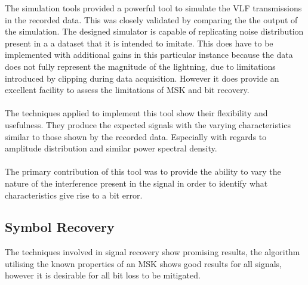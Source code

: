 The simulation tools provided a powerful tool to simulate the VLF transmissions in the recorded data. This was closely validated by comparing the the output of the simulation. The designed simulator is capable of replicating noise distribution present in a a dataset that it is intended to imitate. This does have to be implemented with additional gains in this particular instance because the data does not fully represent the magnitude of the lightning, due to limitations introduced by clipping during data acquisition. However it does provide an excellent facility to assess the limitations of MSK and bit recovery.
\\\\
The techniques applied to implement this tool show their flexibility and usefulness. They produce the expected signals with the varying characteristics similar to those shown by the recorded data. Especially with regards to amplitude distribution and similar power spectral density.
\\\\
The primary contribution of this tool was to provide the ability to vary the nature of the interference present in the signal in order to identify what characteristics give rise to a bit error.

\subsection{Symbol Recovery}
The techniques involved in signal recovery show promising results, the algorithm utilising the known properties of an MSK shows good results for all signals, however it is desirable for all bit loss to be mitigated.

